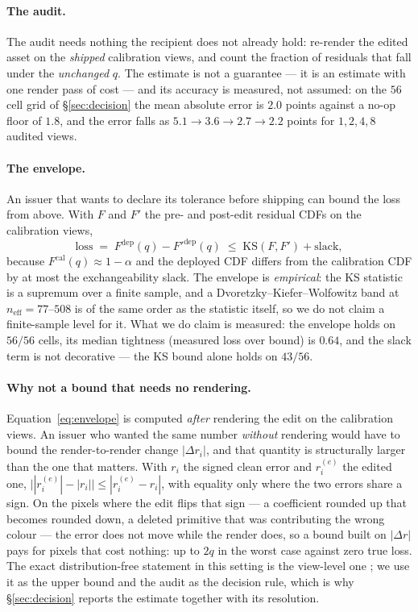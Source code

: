 \documentclass[preprint,number,3p]{elsarticle}
\begin{document}
\paragraph{The audit.} The audit needs nothing the recipient does not already hold: re-render the edited asset on
the \emph{shipped} calibration views, and count the fraction of residuals that fall under the \emph{unchanged} $q$.
The estimate is not a guarantee --- it is an estimate with one render pass of cost --- and its accuracy is measured,
not assumed: on the $56$ cell grid of \S\ref{sec:decision} the mean absolute error is $2.0$ points against a no-op
floor of $1.8$, and the error falls as $5.1 \to 3.6 \to 2.7 \to 2.2$ points for $1, 2, 4, 8$ audited views.

\paragraph{The envelope.} An issuer that wants to declare its tolerance before shipping can bound the loss from
above. With $F$ and $F'$ the pre- and post-edit residual CDFs on the calibration views,
\begin{equation}
  \mathrm{loss} \;=\; F^{\mathrm{dep}}(q) - F'^{\mathrm{dep}}(q)
  \;\le\; \mathrm{KS}(F, F') + \mathrm{slack},
  \label{eq:envelope}
\end{equation}
because $F^{\mathrm{cal}}(q) \approx 1-\alpha$ and the deployed CDF differs from the calibration CDF by at most the
exchangeability slack. The envelope is \emph{empirical}: the KS statistic is a supremum over a finite sample, and a
Dvoretzky--Kiefer--Wolfowitz band \cite{dkw1956,massart1990} at $n_{\mathrm{eff}} = 77$--$508$ is of the same order as
the statistic itself, so we do not claim a finite-sample level for it. What we do claim is measured: the envelope
holds on $56/56$ cells, its median tightness (measured loss over bound) is $0.64$, and the slack term is not
decorative --- the KS bound alone holds on $43/56$.

\paragraph{Why not a bound that needs no rendering.} Equation~\eqref{eq:envelope} is computed \emph{after}
rendering the edit on the calibration views. An issuer who wanted the same number \emph{without} rendering would
have to bound the render-to-render change $|\Delta r_i|$, and that quantity is structurally larger than the one
that matters. With $r_i$ the signed clean error and $r^{(e)}_i$ the edited one,
$\bigl||r^{(e)}_i|-|r_i|\bigr| \le |r^{(e)}_i-r_i|$, with equality only where the two errors share a sign. On
the pixels where the edit flips that sign --- a coefficient rounded up that becomes rounded down, a deleted
primitive that was contributing the wrong colour --- the error does not move while the render does, so a bound
built on $|\Delta r|$ pays for pixels that cost nothing: up to $2q$ in the worst case against zero true loss.
The exact distribution-free statement in this setting is the view-level one \cite{vscp}; we use it as the upper
bound and the audit as the decision rule, which is why \S\ref{sec:decision} reports the estimate together with
its resolution.
\end{document}
